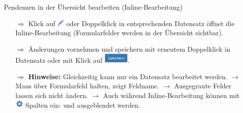 \documentclass{article}
\begin{document}
\begin{beamerlikethm}{Pendenzen in der Übersicht bearbeiten (Inline-Bearbeitung)}
\begin{itemize}
  \item[$\Longrightarrow$] Klick auf \includegraphics[height=10pt]{Icons/Stift.png} oder Doppelklick in entsprechenden Datensatz öffnet die Inline-Bearbeitung (Formularfelder werden in der Übersicht sichtbar).
  \item[$\Longrightarrow$] Änderungen vornehmen und speichern mit erneutem Doppelklick in Datensatz oder mit Klick auf \includegraphics[height=14pt]{Icons/Speichern.png}.
  \item[$\Longrightarrow$] \textbf{Hinweise:} Gleichzeitig kann nur ein Datensatz bearbeitet werden. $\rightarrow$ Maus über Formularfeld halten, zeigt Feldname. $\rightarrow$ Ausgegraute Felder lassen sich nicht ändern. $\rightarrow$ Auch während Inline-Bearbeitung können mit \includegraphics[height=12pt]{Icons/SpaltenEinst.png} Spalten ein- und ausgeblendet werden.
\end{itemize}
\end{beamerlikethm}

\end{document}
